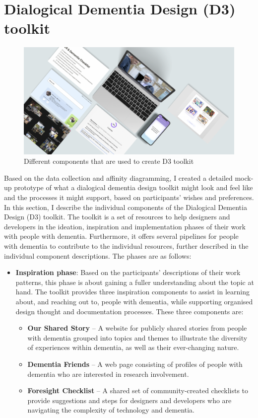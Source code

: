 \section{Dialogical Dementia Design (D3) toolkit}
\label{D3:Toolit}

\begin{figure}[h]
\centering
\includegraphics[width=1\linewidth]{Images/D3Toolkit/Fig4.png}
\caption{Different components that are used to create D3 toolkit}
\label{fig:D3Overview}
\end{figure}
Based on the data collection and affinity diagramming, I created a detailed mock-up prototype of what a dialogical dementia design toolkit might look and feel like and the processes it might support, based on participants’ wishes and preferences. In this section, I describe the individual components of the Dialogical Dementia Design (D3) toolkit. The toolkit is a set of resources to help designers and developers in the ideation, inspiration and implementation phases of their work with people with dementia. Furthermore, it offers several pipelines for people with dementia to contribute to the individual resources, further described in the individual component descriptions. The phases are as follows:

\begin{itemize}
    \item 
\textbf{Inspiration phase}: Based on the participants’ descriptions of their work patterns, this phase is about gaining a fuller understanding about the topic at hand. The toolkit provides three inspiration components to assist in learning about, and reaching out to, people with dementia, while supporting organised design thought and documentation processes. These three components are:
\begin{itemize}
    \item \textbf{Our Shared Story }– A website for publicly shared stories from people with dementia grouped into topics and themes to illustrate the diversity of experiences within dementia, as well as their ever-changing nature.
    \item \textbf{Dementia Friends} – A web page consisting of profiles of people with dementia who are interested in research involvement. 
    \item \textbf{Foresight Checklist }– A shared set of community-created checklists to provide suggestions and steps for designers and developers who are navigating the complexity of technology and dementia.
\end{itemize}
\end{itemize}

